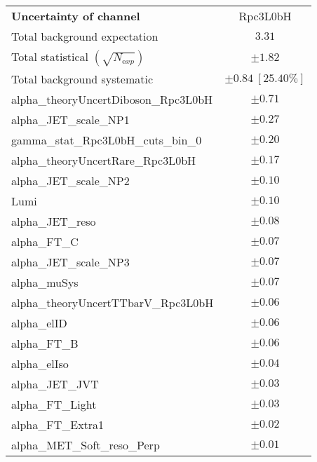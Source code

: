 
\begin{table}
\begin{center}
\setlength{\tabcolsep}{0.0pc}
\begin{tabular*}{\textwidth}{@{\extracolsep{\fill}}lc}
\noalign{\smallskip}\hline\noalign{\smallskip}
{\bfseries Uncertainty of channel}                                    & Rpc3L0bH            \\
\noalign{\smallskip}\hline\noalign{\smallskip}
Total background expectation             &  $3.31$       \\
\noalign{\smallskip}\hline\noalign{\smallskip}
Total statistical $(\sqrt{N_{\mathrm exp}})$              & $\pm 1.82$       \\
Total background systematic               & $\pm 0.84\ [25.40\%] $             \\
\noalign{\smallskip}\hline\noalign{\smallskip}
\noalign{\smallskip}\hline\noalign{\smallskip}
alpha\_theoryUncertDiboson\_Rpc3L0bH         & $\pm 0.71$       \\
alpha\_JET\_scale\_NP1         & $\pm 0.27$       \\
gamma\_stat\_Rpc3L0bH\_cuts\_bin\_0         & $\pm 0.20$       \\
alpha\_theoryUncertRare\_Rpc3L0bH         & $\pm 0.17$       \\
alpha\_JET\_scale\_NP2         & $\pm 0.10$       \\
Lumi         & $\pm 0.10$       \\
alpha\_JET\_reso         & $\pm 0.08$       \\
alpha\_FT\_C         & $\pm 0.07$       \\
alpha\_JET\_scale\_NP3         & $\pm 0.07$       \\
alpha\_muSys         & $\pm 0.07$       \\
alpha\_theoryUncertTTbarV\_Rpc3L0bH         & $\pm 0.06$       \\
alpha\_elID         & $\pm 0.06$       \\
alpha\_FT\_B         & $\pm 0.06$       \\
alpha\_elIso         & $\pm 0.04$       \\
alpha\_JET\_JVT         & $\pm 0.03$       \\
alpha\_FT\_Light         & $\pm 0.03$       \\
alpha\_FT\_Extra1         & $\pm 0.02$       \\
alpha\_MET\_Soft\_reso\_Perp         & $\pm 0.01$       \\

\end{tabular*}
\end{center}
\end{table}
